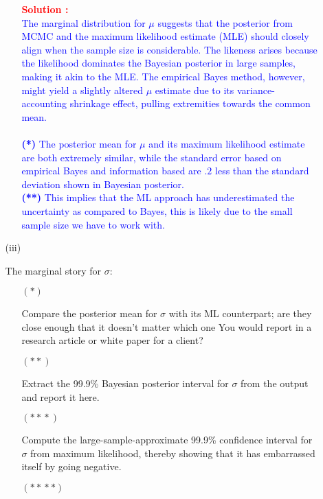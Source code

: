 \documentclass[12pt]{article}
\begin{document}
\begin{itemize}
\begin{itemize}
\begin{itemize}
\textcolor{red}{\textbf{Solution :}} \\
\textcolor{blue}{
The marginal distribution for \( \mu \) suggests that the posterior from MCMC and the maximum likelihood estimate (MLE) should closely align when the sample size is considerable. The likeness arises because the likelihood dominates the Bayesian posterior in large samples, making it akin to the MLE. The empirical Bayes method, however, might yield a slightly altered \( \mu \) estimate due to its variance-accounting shrinkage effect, pulling extremities towards the common mean.
\\ \\ 
\textbf{(*)} The posterior mean for \( \mu \) and its maximum likelihood estimate are both extremely similar, while the standard error based on empirical Bayes and information based are \( .2 \) less than the standard deviation shown in Bayesian posterior. \\
\textbf{(**)} This implies that the ML approach has underestimated the uncertainty as compared to Bayes, this is likely due to the small sample size we have to work with.
}
\end{itemize}

\item[(iii)]

The marginal story for $\sigma$:

\begin{itemize}

\item[$( * )$]

Compare the posterior mean for $\sigma$ with its ML counterpart; are they close enough that it doesn't matter which one You would report in a research article or white paper for a client? \textit{\fbox{\textbf{[10 points]}}} 

\item[$( ** )$]

Extract the 99.9\% Bayesian posterior interval for $\sigma$ from the output and report it here. \textit{\fbox{\textbf{[10 points]}}} 

\item[$( * \! * \! * )$]

Compute the large-sample-approximate 99.9\% confidence interval for $\sigma$ from maximum likelihood, thereby showing that it has embarrassed itself by going negative. \textit{\fbox{\textbf{[10 points]}}} \vspace*{0.025in} 

\item[$( * \! * \! * * )$]


\end{itemize}
\end{itemize}
\end{itemize}
\end{document}
